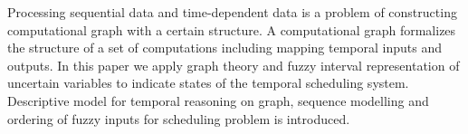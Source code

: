 Processing sequential data and time-dependent data is a problem of constructing computational graph with a certain structure. A computational graph formalizes the structure of a set of computations including mapping temporal inputs and outputs. In this paper we apply graph theory and fuzzy interval representation of uncertain variables to indicate states of the temporal scheduling system. Descriptive model for temporal reasoning on graph, sequence modelling and ordering of fuzzy inputs for scheduling problem is introduced.


